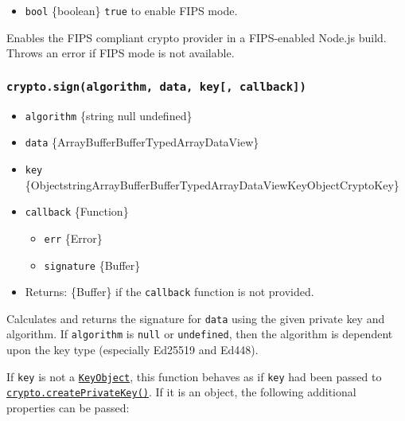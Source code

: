 \begin{itemize}
\tightlist
\item
  \texttt{bool} \{boolean\} \texttt{true} to enable FIPS mode.
\end{itemize}

Enables the FIPS compliant crypto provider in a FIPS-enabled Node.js
build. Throws an error if FIPS mode is not available.

\subsubsection{\texorpdfstring{\texttt{crypto.sign(algorithm,\ data,\ key{[},\ callback{]})}}{crypto.sign(algorithm, data, key{[}, callback{]})}}\label{crypto.signalgorithm-data-key-callback}

\begin{itemize}
\tightlist
\item
  \texttt{algorithm} \{string \textbar{} null \textbar{} undefined\}
\item
  \texttt{data}
  \{ArrayBuffer\textbar Buffer\textbar TypedArray\textbar DataView\}
\item
  \texttt{key}
  \{Object\textbar string\textbar ArrayBuffer\textbar Buffer\textbar TypedArray\textbar DataView\textbar KeyObject\textbar CryptoKey\}
\item
  \texttt{callback} \{Function\}

  \begin{itemize}
  \tightlist
  \item
    \texttt{err} \{Error\}
  \item
    \texttt{signature} \{Buffer\}
  \end{itemize}
\item
  Returns: \{Buffer\} if the \texttt{callback} function is not provided.
\end{itemize}

Calculates and returns the signature for \texttt{data} using the given
private key and algorithm. If \texttt{algorithm} is \texttt{null} or
\texttt{undefined}, then the algorithm is dependent upon the key type
(especially Ed25519 and Ed448).

If \texttt{key} is not a \hyperref[class-keyobject]{\texttt{KeyObject}},
this function behaves as if \texttt{key} had been passed to
\hyperref[cryptocreateprivatekeykey]{\texttt{crypto.createPrivateKey()}}.
If it is an object, the following additional properties can be passed:

